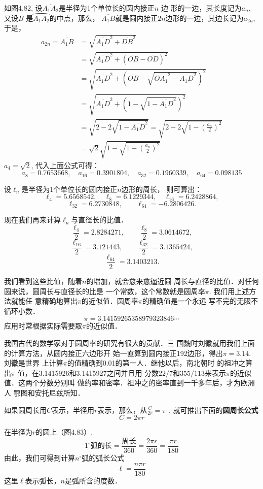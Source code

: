 如图4.82, 设$\overline{A_1A_2}$是半径为1个单位长的圆内接正$n$
边
形的一边，其长度记为$a_n$, 又设$B$
是$\wideparen{A_1A_2}$的中点，那么，
$\overline{A_1B}$就是圆内接正$2n$边形的一边，其边长记为$a_{2n}$, 于是，
\[\begin{split}
a_{2n}=\overline{A_1B}&=\sqrt{\overline{A_1D}^2+\overline{DB}^2}\\
&=\sqrt{\overline{A_1D}^2+\left(\overline{OB}-\overline{OD}\right)^2}\\
&=\sqrt{\overline{A_1D}^2+\left(\overline{OB}-\sqrt{\overline{OA_1}^2-\overline{A_1D}^2}\right)^2}\\
&=\sqrt{\overline{A_1D}^2+\left(1-\sqrt{1-\overline{A_1D}^2}\right)^2}\\
&=\sqrt{2-2\sqrt{1-\overline{A_1D}^2}}=\sqrt{2-2\sqrt{1-\left(\frac{a_n}{2}\right)^2}}\\
&=\sqrt{2}\sqrt{1-\sqrt{1-\left(\frac{a_n}{2}\right)^2}}
\end{split}\]
$a_4=\sqrt{2}$, 代入上面公式可得：
\[a_8=0.7653668,\quad a_{16}=0.3901804,\quad
a_{32}=0.1960339,\quad a_{64}=0.098135\]

设$\ell_n$是半径为1个单位长的圆内接正$n$边形的周长，
则可算出：
\[\ell_4=5.6568542,\quad \ell_8=6.1229344,\quad 
\ell_{16}=6.2428864,\]
\[\ell_{32}=6.2730848,\qquad \ell_{64}=-6.2806426.\]

现在我们再来计算$\ell_n$与直径长的比值．
\[\frac{\ell_4}{2}=2.8284271,\qquad \frac{\ell_8}{2}=3.0614672,\]
\[\frac{\ell_{16}}{2}=3.121443,\qquad \frac{\ell_{32}}{2}=3.1365424,\]
\[\frac{\ell_{64}}{2}=3.1403213.\]

我们看到这些比值，随着$n$的增加，就会愈来愈逼近圆
周长与直径的比值．对任何圆来说，圆周长与直径长的比是
一个常数，这个常数就是圆周率$\pi$. 我们用上述方法就能任
意精确地算出$\pi$的近似值．圆周率$\pi$的精确值是一个永远
写不完的无限不循环小数．
\[\pi=3.14159265358979323846\cdots\]
应用时常根据实际需要取$\pi$的近似值．

我国古代的数学家对于圆周率的研究有很大的贡献．三
国魏时刘徽就用我们上面的计算方法，从圆内接正六边形开
始一直算到圆内接正192边形，得出$\pi=3.14$. 刘徽是世界
上计算$\pi$的值精确到0.01的第一人．继他以后，南北朝时
的祖冲之算出$\pi$
值，在3.1415926和3.1415927之间并且用
分数$22/7$和$355/113$来表示$\pi$的近似值．这两个分数分别叫
做约率和密率．祖冲之的密率直到一千多年后，才为欧洲人
鄂图和安托尼兹所知．

如果圆周长用$C$表示，半径用$r$表示，那么，从$\frac{C}{2r}=\pi$
, 就可推出下面的\textbf{圆周长公式}
\[C=2\pi r\]

在半径为$r$的圆上（图4.83）,
\[1^{\circ}\text{弧的长}=\frac{\text{周长}}{360}=\frac{2\pi r}{360}=\frac{\pi r}{180}\]
由此，我们可得到计算$n^{\circ}$弧的弧长公式
\[\ell=\frac{n\pi r}{180}\]
这里$\ell$表示弧长，$n$是弧所含的度数．

